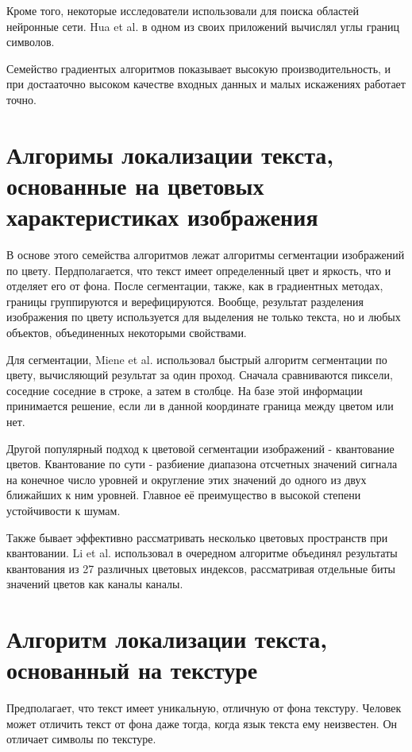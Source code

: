 \documentclass[oneside,final,14pt]{extreport}
\begin{document}
Кроме того, некоторые исследователи использовали для поиска областей нейронные сети.  Hua et al. в одном из своих приложений вычислял углы границ символов. 

Семейство градиентых алгоритмов показывает высокую производительность, и при достааточно высоком качестве входных данных и малых искажениях работает точно.

\section{Алгоримы локализации текста, основанные на цветовых характеристиках изображения}

 В основе этого семейства алгоритмов лежат алгоритмы сегментации изображений по цвету. Пердполагается, что текст имеет определенный цвет и яркость, что и отделяет его от фона.  После сегментации, также, как в градиентных методах, границы группируются и верефицируются. Вообще,  результат разделения изображения по цвету используется для выделения не только текста, но и любых объектов, объединенных некоторыми свойствами.

Для сегментации, Miene et al. использовал быстрый алгоритм сегментации по цвету, вычисляющий результат за один проход. Сначала сравниваются пиксели, соседние соседние в строке, а затем в столбце. На базе этой информации принимается решение, если ли в данной координате граница между цветом или нет.    

Другой популярный подход к цветовой сегментации изображений - квантование цветов. Квантование по сути - разбиение диапазона отсчетных значений сигнала на конечное число уровней и округление этих значений до одного из двух ближайших к ним уровней. Главное её преимущество в высокой степени устойчивости к шумам. 

Также бывает эффективно рассматривать несколько цветовых пространств при квантовании. Li et al. использовал в очередном алгоритме объединял результаты квантования из 27 различных цветовых индексов, рассматривая  отдельные биты значений цветов как каналы каналы. 

\section{Алгоритм локализации текста, основанный на текстуре}

Предполагает, что текст имеет уникальную, отличную от фона текстуру. Человек может отличить текст от фона даже тогда, когда язык текста ему неизвестен. Он отличает символы по текстуре. 
\end{document}
